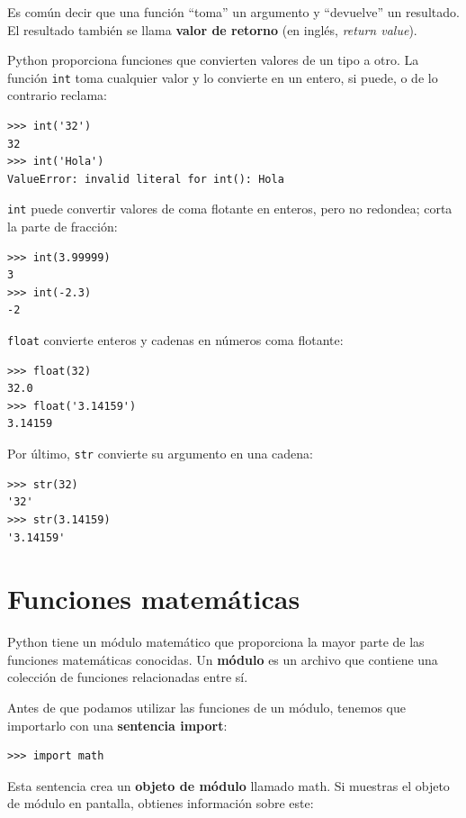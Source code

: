 \documentclass[10pt]{book}
\begin{document}
Es común decir que una función ``toma'' un argumento y ``devuelve''
un resultado.  El resultado también se llama {\bf valor de retorno} (en inglés, {\em return value}).

Python proporciona funciones que convierten valores
de un tipo a otro.  La función {\tt int} toma cualquier valor y
lo convierte en un entero, si puede, o de lo contrario reclama:

\begin{verbatim}
>>> int('32')
32
>>> int('Hola')
ValueError: invalid literal for int(): Hola
\end{verbatim}
%
{\tt int} puede convertir valores de coma flotante en enteros, pero
no redondea; corta la parte de fracción:

\begin{verbatim}
>>> int(3.99999)
3
>>> int(-2.3)
-2
\end{verbatim}
%
{\tt float} convierte enteros y cadenas en números coma
flotante:

\begin{verbatim}
>>> float(32)
32.0
>>> float('3.14159')
3.14159
\end{verbatim}
%
Por último, {\tt str} convierte su argumento en una cadena:

\begin{verbatim}
>>> str(32)
'32'
>>> str(3.14159)
'3.14159'
\end{verbatim}
%

\section{Funciones matemáticas}

Python tiene un módulo matemático que proporciona la mayor parte de las
funciones matemáticas conocidas.  Un {\bf módulo} es un archivo que contiene una
colección de funciones relacionadas entre sí.

Antes de que podamos utilizar las funciones de un módulo, tenemos que importarlo con
una {\bf sentencia import}:

\begin{verbatim}
>>> import math
\end{verbatim}
%
Esta sentencia crea un {\bf objeto de módulo} llamado math.  Si
muestras el objeto de módulo en pantalla, obtienes información sobre este:
\end{document}
